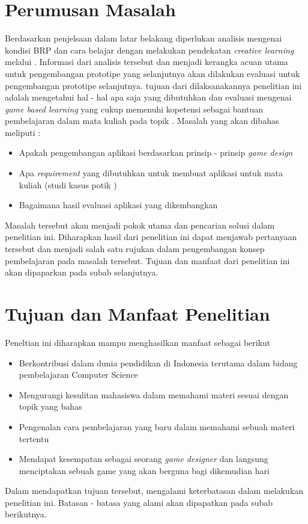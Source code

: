 \section{Perumusan Masalah}
Berdasarkan penjelsaan dalam latar belakang diperlukan analisis mengenai kondisi BRP dan cara belajar dengan melakukan pendekatan \textit{creative learning} melalui \game. Informasi dari analisis tersebut dan menjadi kerangka acuan utama untuk pengembangan prototipe \game yang selanjutnya akan dilakukan evaluasi untuk pengembangan prototipe selanjutnya.
\linebreak\linebreak
tujuan dari dilaksanakannya penelitian ini adalah mengetahui hal - hal apa saja yang dibutuhkan dan evaluasi mengenai \textit{game based learning} yang cukup memenuhi kopetensi sebagai bantuan pembelajaran dalam mata kuliah \ddp  pada topik \topik. Masalah yang akan dibahas meliputi :
\begin{itemize}
	\item Apakah pengembangan aplikasi \game berdasarkan prinsip - prinsip \textit{game design}
	\item Apa \textit{requirement} yang dibutuhkan untuk membuat aplikasi \game untuk mata kuliah \ddp (studi kasus potik \topik)
	\item Bagaimana hasil evaluasi aplikasi \game yang dikembangkan
\end{itemize}
Masalah tersebut akan menjadi pokok utama dan pencarian solusi dalam penelitian ini. Diharapkan hasil dari penelitian ini dapat menjawab pertanyaan tersebut dan menjadi salah satu rujukan dalam pengembangan konsep pembelajaran pada masalah tersebut. Tujuan dan manfaat dari penelitian ini akan dipaparkan pada subab selanjutnya.

\section{Tujuan dan Manfaat Penelitian}
Peneltian ini diharapkan mampu menghasilkan manfaat sebagai berikut
\begin{itemize}
	\item Berkontribusi dalam dunia pendidikan di Indonesia terutama dalam bidang pembelajaran Computer Science
	\item Mengurangi kesulitan mahasiswa dalam memahami materi sesuai dengan topik yang \saya bahas
	\item Pengenalan cara pembelajaran yang baru dalam memahami sebuah materi tertentu
	\item Mendapat kesempatan sebagai seorang \textit{game designer} dan langsung menciptakan sebuah game yang akan berguna bagi \saya dikemudian hari
\end{itemize}
Dalam mendapatkan tujuan tersebut, \saya mengalami keterbatasan dalam melakukan penelitian ini. Batasan - batasa yang \saya alami akan dipapatkan pada subab berikutnya.

